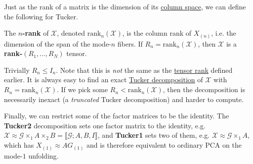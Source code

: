   Just as the rank of a matrix is the dimension of its \hyperref[lin-def:column-space]{column space}, we can define the following for Tucker.

  \begin{definition}[$n$-Rank]
    \label{def:n-rank}
    The \textbf{$n$-rank} of $\mathcal{X}$, denoted $\mathrm{rank}_n(\mathcal{X})$, is the column rank of $X_{(n)}$, i.e. the dimension of the span of the mode-$n$ fibers. If $R_n = \mathrm{rank}_n (\mathcal{X})$, then $\mathcal{X}$ is a \textbf{rank-$(R_1, \ldots, R_N)$} tensor.
  \end{definition}

  Trivially $R_n \leq I_n$. Note that this is \textit{not} the same as the \hyperref[def:tensor-rank]{tensor rank} defined earlier. It is always easy to find an exact \hyperref[def:tucker-decomposition]{Tucker decomposition} of $\mathcal{X}$ with $R_n = \mathrm{rank}_n(\mathcal{X})$. If we pick some $R_n < \mathrm{rank}_n(\mathcal{X})$, then the decomposition is necessarily inexact (a \textit{truncated} Tucker decomposition) and harder to compute.

  Finally, we can restrict some of the factor matrices to be the identity. The \textbf{Tucker2} decomposition sets one factor matrix to the identity, e.g. $\mathcal{X} \approx \mathcal{G} \times_1 A \times_2 B = \llbracket \mathcal{G}; A, B, I \rrbracket$, and \textbf{Tucker1} sets two of them, e.g. $\mathcal{X} \approx \mathcal{G} \times_1 A$, which has $X_{(1)} \approx A G_{(1)}$ and is therefore equivalent to ordinary PCA on the mode-$1$ unfolding.